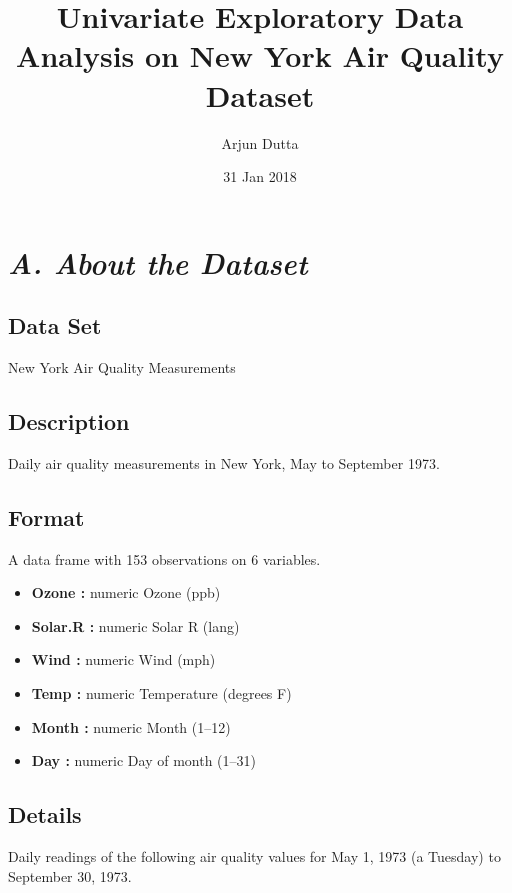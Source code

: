 \documentclass[12pt,]{article}
\title{Univariate Exploratory Data Analysis on New York Air Quality Dataset}
\author{Arjun Dutta}
\date{31 Jan 2018}
\begin{document}
\maketitle

\section{\texorpdfstring{\emph{A. About the
Dataset}}{A. About the Dataset}}\label{a.-about-the-dataset}

\subsection{\texorpdfstring{\textbf{Data
Set}}{Data Set}}\label{data-set}

New York Air Quality Measurements

\subsection{\texorpdfstring{\textbf{Description}}{Description}}\label{description}

Daily air quality measurements in New York, May to September 1973.

\subsection{\texorpdfstring{\textbf{Format}}{Format}}\label{format}

A data frame with 153 observations on 6 variables.

\begin{itemize}
\item
  \textbf{Ozone :} numeric Ozone (ppb)
\item
  \textbf{Solar.R :} numeric Solar R (lang)
\item
  \textbf{Wind :} numeric Wind (mph)
\item
  \textbf{Temp :} numeric Temperature (degrees F)
\item
  \textbf{Month :} numeric Month (1--12)
\item
  \textbf{Day :} numeric Day of month (1--31)
\end{itemize}

\subsection{\texorpdfstring{\textbf{Details}}{Details}}\label{details}

Daily readings of the following air quality values for May 1, 1973 (a
Tuesday) to September 30, 1973.
\end{document}
